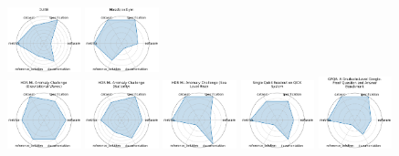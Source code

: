\begin{figure}[ht!]
\includegraphics[width=0.1900\textwidth]{images/dune_radar.pdf}
\includegraphics[width=0.1900\textwidth]{images/massspecgym_radar.pdf}
\\[1ex]
\includegraphics[width=0.1900\textwidth]{images/hdr_ml_anomaly_challenge_gravitational_waves_radar.pdf}
\includegraphics[width=0.1900\textwidth]{images/hdr_ml_anomaly_challenge_butterfly_radar.pdf}
\includegraphics[width=0.1900\textwidth]{images/hdr_ml_anomaly_challenge_sea_level_rise_radar.pdf}
\includegraphics[width=0.1900\textwidth]{images/single_qubit_readout_on_qick_system_radar.pdf}
\includegraphics[width=0.1900\textwidth]{images/gpqa_a_graduate-level_google-proof_question_and_answer_benchmark_radar.pdf}

\end{figure}
